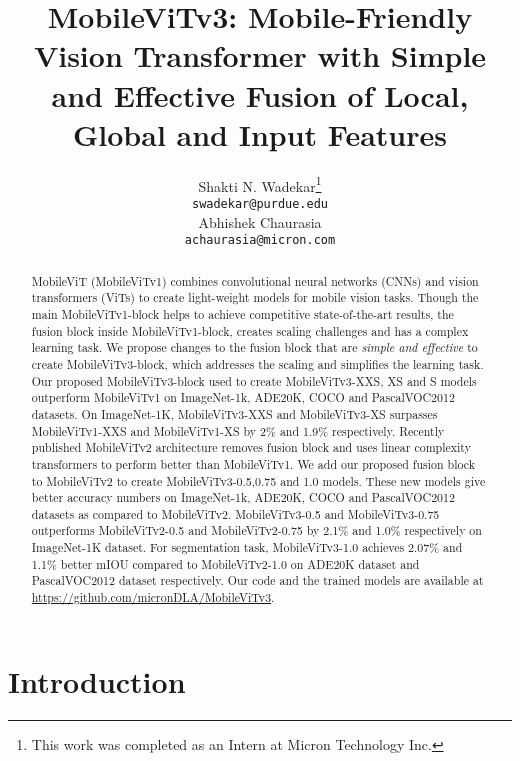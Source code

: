 \documentclass{article} \usepackage{iclr2022_conference,times}
\title{MobileViTv3: Mobile-Friendly Vision Transformer with Simple and Effective Fusion of Local, Global and Input Features}
\author{Shakti N. Wadekar\thanks{This work was completed as an Intern at Micron Technology Inc.} \\
\texttt{swadekar@purdue.edu} \\
\And
Abhishek Chaurasia \\
\texttt{achaurasia@micron.com} \\
}
\begin{document}
\maketitle

\begin{abstract}
MobileViT (MobileViTv1) combines convolutional neural networks (CNNs) and vision transformers (ViTs) to create light-weight models for mobile vision tasks.
Though the main MobileViTv1-block helps to achieve competitive state-of-the-art results, the fusion block inside MobileViTv1-block, creates scaling challenges and has a complex learning task.
We propose changes to the fusion block that are \textit{simple and effective} to create MobileViTv3-block, which addresses the scaling and simplifies the learning task. 
Our proposed MobileViTv3-block used to create MobileViTv3-XXS, XS and S models outperform MobileViTv1 on ImageNet-1k, ADE20K, COCO and PascalVOC2012 datasets. 
On ImageNet-1K, MobileViTv3-XXS and MobileViTv3-XS surpasses MobileViTv1-XXS and MobileViTv1-XS by 2\% and 1.9\% respectively.
Recently published MobileViTv2 architecture removes fusion block and uses linear complexity transformers to perform better than MobileViTv1. 
We add our proposed fusion block to MobileViTv2 to create MobileViTv3-0.5,0.75 and 1.0 models.
These new models give better accuracy numbers on ImageNet-1k, ADE20K, COCO and PascalVOC2012 datasets as compared to MobileViTv2.
MobileViTv3-0.5 and MobileViTv3-0.75 outperforms MobileViTv2-0.5 and MobileViTv2-0.75 by 2.1\% and 1.0\% respectively on ImageNet-1K dataset.
For segmentation task, MobileViTv3-1.0 achieves 2.07\% and 1.1\% better mIOU compared to MobileViTv2-1.0 on ADE20K dataset and PascalVOC2012 dataset respectively. 
Our code and the trained models are available at \href{https://github.com/micronDLA/MobileViTv3}{https://github.com/micronDLA/MobileViTv3}.
\end{abstract}

\section{Introduction}
\end{document}
